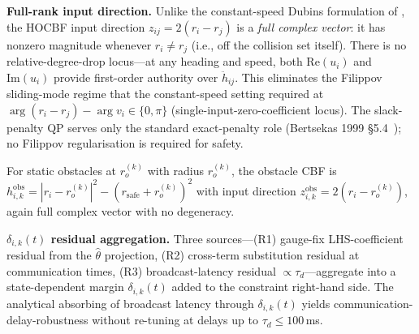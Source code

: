 \documentclass[letterpaper,10pt,conference]{IEEEtran}
\newcommand{\rsafe}{r_{\text{safe}}}
\newcommand{\thethat}{\hat\theta}
\renewcommand{\Re}{\mathrm{Re}}
\renewcommand{\Im}{\mathrm{Im}}
\begin{document}
\textbf{Full-rank input direction.} Unlike the constant-speed Dubins formulation of \cite{maldonadoAnnaswamy2025}, the HOCBF input direction $z_{ij} = 2(r_i-r_j)$ is a \emph{full complex vector}: it has nonzero magnitude whenever $r_i \ne r_j$ (i.e., off the collision set itself). There is no relative-degree-drop locus—at any heading and speed, both $\Re(u_i)$ and $\Im(u_i)$ provide first-order authority over $\ddot h_{ij}$. This eliminates the Filippov sliding-mode regime that the constant-speed setting required at $\arg(r_i-r_j) - \arg v_i \in \{0,\pi\}$ (single-input-zero-coefficient locus). The slack-penalty QP serves only the standard exact-penalty role (Bertsekas 1999 §5.4~\cite{bertsekas1999}); no Filippov regularisation is required for safety.

For static obstacles at $r_o^{(k)}$ with radius $r_o^{(k)}$, the obstacle CBF is $h_{i,k}^{\text{obs}} = |r_i - r_o^{(k)}|^2 - (\rsafe + r_o^{(k)})^2$ with input direction $z_{i,k}^{\text{obs}} = 2(r_i - r_o^{(k)})$, again full complex vector with no degeneracy.

\textbf{$\delta_{i,k}(t)$ residual aggregation.} Three sources—(R1) gauge-fix LHS-coefficient residual from the $\thethat$ projection, (R2) cross-term substitution residual at communication times, (R3) broadcast-latency residual $\propto \tau_d$—aggregate into a state-dependent margin $\delta_{i,k}(t)$ added to the constraint right-hand side. The analytical absorbing of broadcast latency through $\delta_{i,k}(t)$ yields communication-delay-robustness without re-tuning at delays up to $\tau_d \le 100$\,ms.
\end{document}
